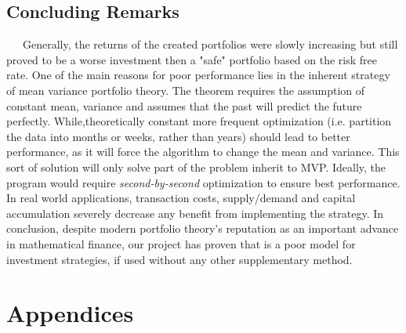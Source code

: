 \documentclass[12pt,titlepage,letter]{article}
\begin{document}
	\subsection{Concluding Remarks}
		\ \ \ Generally, the returns of the created portfolios were slowly increasing but still proved to be a worse investment then a "safe" portfolio based on the risk free rate. One of the main reasons for poor performance lies in the inherent strategy of mean variance portfolio theory. The theorem requires the assumption of constant mean, variance and assumes that the past will predict the future perfectly. While,theoretically constant more frequent optimization (i.e. partition the data into months or weeks, rather than years) should lead to better performance, as it will force the algorithm to change the mean and variance. This sort of solution will only solve part of the problem inherit to MVP. Ideally, the program would require \textit{second-by-second} optimization to ensure best performance. In real world applications, transaction costs, supply/demand and capital accumulation severely decrease any benefit from implementing the strategy.  In conclusion, despite modern portfolio theory's reputation as an important advance in mathematical finance, our project has proven that is a poor model for investment strategies, if used without any other supplementary method.
\newpage

\section{Appendices}

\newpage
\end{document}
